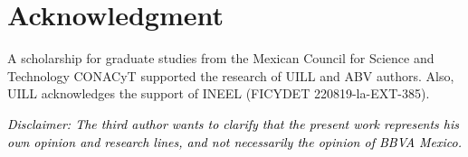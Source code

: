 \documentclass[journal, twoside]{IEEEtran}
\begin{document}
%

\section*{Acknowledgment}
A scholarship for graduate studies from the Mexican Council for Science and Technology CONACyT supported the research of UILL and ABV authors. Also, UILL acknowledges the support of INEEL (FICYDET 220819-la-EXT-385). 

\vspace{1em}\noindent\textit{
\textcolor{black}{Disclaimer: The third author wants to clarify that the present work represents his own opinion and research lines, and not necessarily the opinion of BBVA Mexico.}}






\ifCLASSOPTIONcaptionsoff
  \newpage
\fi



%
\end{document}
